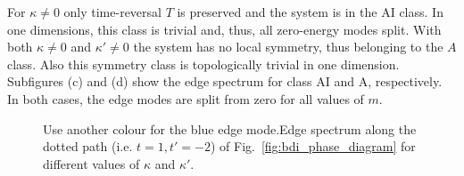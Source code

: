 \documentclass[twocolumn,amsmath,longbibliography,amssymb,superscriptaddress]{revtex4-1}
\newcommand{\carlos}[1]{{\color{red} #1}}
\newcommand{\mariac}[1]{{\it\color{cyan}#1}}
\begin{document}
For $\kappa \neq 0$ only time-reversal $T$ is preserved and the system is in the AI class. 
In one dimensions, this class is trivial and, thus,  all zero-energy modes split. 
With both $\kappa \neq 0$ and $\kappa' \neq0$ the system has no local symmetry, thus belonging to the $A$ class.  
Also this symmetry class is topologically trivial in one dimension. 
Subfigures (c) and (d) show the edge spectrum for class AI and A, respectively. In both cases, the edge modes are split from zero for all values of $m$.


%

\begin{figure}[h!]
\centering

\hspace{0mm}

\caption{\carlos{Use another colour for the blue edge mode.}Edge spectrum along the dotted path (i.e. $t=1,t'=-2$) of Fig.~\ref{fig:bdi_phase_diagram} for different values of $\kappa$ and $\kappa'$.}
\label{fig:zero_E_modes}
\end{figure}
\end{document}
